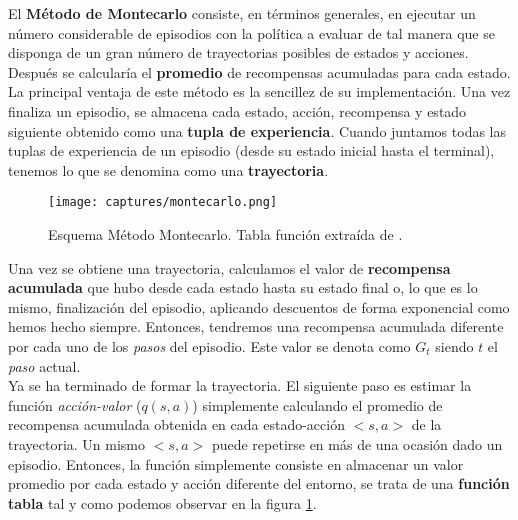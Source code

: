 \documentclass[11pt,fleqn]{book} %
\begin{document}

El \textbf{Método de Montecarlo} \cite{book:miguel} \cite{article:RLromero} consiste, en términos generales, en ejecutar un número considerable de episodios con la política a evaluar de tal manera que se disponga de un gran número de trayectorias posibles de estados y acciones. Después se calcularía el \textbf{promedio} de recompensas acumuladas para cada estado. \\

La principal ventaja de este método es la sencillez de su implementación. Una vez finaliza un episodio, se almacena cada estado, acción, recompensa y estado siguiente obtenido como una \textbf{tupla de experiencia}. Cuando juntamos todas las tuplas de experiencia de un episodio (desde su estado inicial hasta el terminal), tenemos lo que se denomina como una \textbf{trayectoria}. \\

\begin{figure}[H]
	\centering\texttt{[image: captures/montecarlo.png]}
	\caption{Esquema Método Montecarlo. Tabla función extraída de \cite{article:RLromero}.}
	\label{fig:montecarlo} %
\end{figure}

Una vez se obtiene una trayectoria, calculamos el valor de \textbf{recompensa acumulada} que hubo desde cada estado hasta su estado final o, lo que es lo mismo, finalización del episodio, aplicando descuentos de forma exponencial como hemos hecho siempre. Entonces, tendremos una recompensa acumulada diferente por cada uno de los \textit{pasos} del episodio. Este valor se denota como $G_{t}$ siendo $t$ el \textit{paso} actual. \\

Ya se ha terminado de formar la trayectoria. El siguiente paso es estimar la función \textit{acción-valor} ($q(s,a)$) simplemente calculando el promedio de recompensa acumulada obtenida en cada estado-acción $<s,a>$ de la trayectoria. Un mismo $<s,a>$ puede repetirse en más de una ocasión dado un episodio. Entonces, la función simplemente consiste en almacenar un valor promedio por cada estado y acción diferente del entorno, se trata de una \textbf{función tabla} tal y como podemos observar en la figura \ref{fig:montecarlo}.\\
\end{document}
